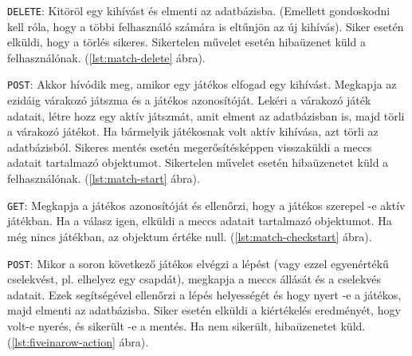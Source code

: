 

\texttt{DELETE}: Kitöröl egy kihívást és elmenti az adatbázisba. (Emellett gondoskodni kell róla, hogy a többi felhasználó számára is eltűnjön az új kihívás).
Siker esetén elküldi, hogy a törlés sikeres.
Sikertelen művelet esetén hibaüzenet küld a felhasználónak. (\ref{lst:match-delete} ábra).



\texttt{POST}: Akkor hívódik meg, amikor egy játékos elfogad egy kihívást. Megkapja az ezidáig várakozó játszma és a játékos azonosítóját. Lekéri a várakozó játék adatait, létre hozz egy aktív játszmát, amit elment az adatbázisban is, majd törli a várakozó játékot. Ha bármelyik játékosnak volt aktív kihívása, azt törli az adatbázisból.
Sikeres mentés esetén megerősítésképpen visszaküldi a meccs adatait tartalmazó objektumot.
Sikertelen művelet esetén hibaüzenetet küld a felhasználónak. (\ref{lst:match-start} ábra).



\texttt{GET}: Megkapja a játékos azonosítóját és ellenőrzi, hogy a játékos szerepel -e aktív játékban. Ha a válasz igen, elküldi a meccs adatait tartalmazó objektumot. Ha még nincs játékban, az objektum értéke null. (\ref{lst:match-checkstart} ábra).




\texttt{POST}: Mikor a soron következő játékos elvégzi a lépést (vagy ezzel egyenértékű cselekvést, pl. elhelyez egy csapdát), megkapja a meccs állását és a cselekvés adatait. Ezek segítségével ellenőrzi a lépés helyességét és hogy nyert -e a játékos, majd elmenti az adatbázisba.
Siker esetén elküldi a kiértékelés eredményét, hogy volt-e nyerés, és sikerült -e a mentés. Ha nem sikerült, hibaüzenetet küld. (\ref{lst:fiveinarow-action} ábra).



